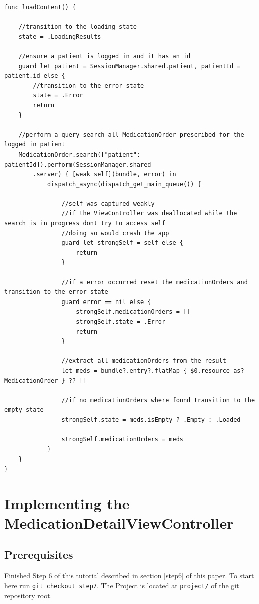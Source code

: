 \documentclass{article}
\begin{document}
\begin{verbatim}
func loadContent() {

    //transition to the loading state
    state = .LoadingResults

    //ensure a patient is logged in and it has an id
    guard let patient = SessionManager.shared.patient, patientId = patient.id else {
        //transition to the error state
        state = .Error
        return
    }

    //perform a query search all MedicationOrder prescribed for the logged in patient
    MedicationOrder.search(["patient": patientId]).perform(SessionManager.shared
        .server) { [weak self](bundle, error) in
            dispatch_async(dispatch_get_main_queue()) {

                //self was captured weakly
                //if the ViewController was deallocated while the search is in progress dont try to access self
                //doing so would crash the app
                guard let strongSelf = self else {
                    return
                }

                //if a error occurred reset the medicationOrders and transition to the error state
                guard error == nil else {
                    strongSelf.medicationOrders = []
                    strongSelf.state = .Error
                    return
                }

                //extract all medicationOrders from the result
                let meds = bundle?.entry?.flatMap { $0.resource as? MedicationOrder } ?? []

                //if no medicationOrders where found transition to the empty state
                strongSelf.state = meds.isEmpty ? .Empty : .Loaded

                strongSelf.medicationOrders = meds
            }
    }
}
\end{verbatim}

\section{Implementing the MedicationDetailViewController}\label{step7}

\subsection{Prerequisites}\label{step7:prerequisites}
Finished Step 6 of this tutorial described in section \ref{step6} of this paper.
To start here run \texttt{git checkout step7}.
The Project is located at \texttt{project/} of the git repository root.
\end{document}
